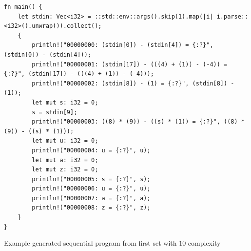 \begin{code}
\begin{verbatim}
fn main() {
    let stdin: Vec<i32> = ::std::env::args().skip(1).map(|i| i.parse::<i32>().unwrap()).collect();
    {
        println!("00000000: (stdin[0]) - (stdin[4]) = {:?}", (stdin[0]) - (stdin[4]));
        println!("00000001: (stdin[17]) - (((4) + (1)) - (-4)) = {:?}", (stdin[17]) - (((4) + (1)) - (-4)));
        println!("00000002: (stdin[8]) - (1) = {:?}", (stdin[8]) - (1));
        let mut s: i32 = 0;
        s = stdin[9];
        println!("00000003: ((8) * (9)) - ((s) * (1)) = {:?}", ((8) * (9)) - ((s) * (1)));
        let mut u: i32 = 0;
        println!("00000004: u = {:?}", u);
        let mut a: i32 = 0;
        let mut z: i32 = 0;
        println!("00000005: s = {:?}", s);
        println!("00000006: u = {:?}", u);
        println!("00000007: a = {:?}", a);
        println!("00000008: z = {:?}", z);
    }
}
\end{verbatim}
\caption{\label{code:genprogram1}Example generated sequential program from first set with $10$ complexity}
\end{code}

